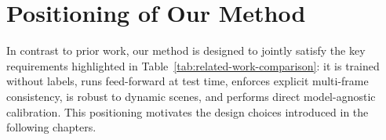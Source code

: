 \section{Positioning of Our Method}
\label{sec:rw_positioning}

In contrast to prior work, our method is designed to jointly satisfy the key requirements highlighted in Table~\ref{tab:related-work-comparison}: it is trained without labels, runs feed-forward at test time, enforces explicit multi-frame consistency, is robust to dynamic scenes, and performs direct model-agnostic calibration. This positioning motivates the design choices introduced in the following chapters.
